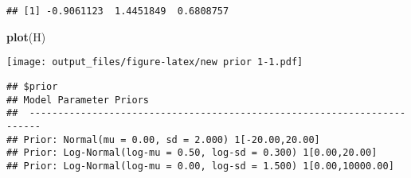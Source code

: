 \documentclass[]{article}
\newenvironment{Shaded}{\begin{snugshade}}{\end{snugshade}}
\newcommand{\DataTypeTok}[1]{\textcolor[rgb]{0.13,0.29,0.53}{#1}}
\newcommand{\DecValTok}[1]{\textcolor[rgb]{0.00,0.00,0.81}{#1}}
\newcommand{\FloatTok}[1]{\textcolor[rgb]{0.00,0.00,0.81}{#1}}
\newcommand{\KeywordTok}[1]{\textcolor[rgb]{0.13,0.29,0.53}{\textbf{#1}}}
\newcommand{\NormalTok}[1]{#1}
\newcommand{\OperatorTok}[1]{\textcolor[rgb]{0.81,0.36,0.00}{\textbf{#1}}}
\newcommand{\StringTok}[1]{\textcolor[rgb]{0.31,0.60,0.02}{#1}}
\begin{document}
\begin{Shaded}
\end{Shaded}

\begin{verbatim}
## [1] -0.9061123  1.4451849  0.6808757
\end{verbatim}

\begin{Shaded}
\begin{Highlighting}[]
\KeywordTok{plot}\NormalTok{(H)}
\end{Highlighting}
\end{Shaded}

\texttt{[image: output\_files/figure-latex/new prior 1-1.pdf]}

\begin{Shaded}
\end{Shaded}

\begin{verbatim}
## $prior
## Model Parameter Priors
##  ------------------------------------------------------------------------
## Prior: Normal(mu = 0.00, sd = 2.000) 1[-20.00,20.00]
## Prior: Log-Normal(log-mu = 0.50, log-sd = 0.300) 1[0.00,20.00]
## Prior: Log-Normal(log-mu = 0.00, log-sd = 1.500) 1[0.00,10000.00]
\end{verbatim}
\end{document}
